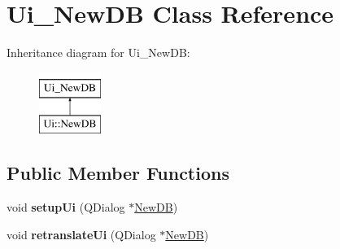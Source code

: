 \hypertarget{classUi__NewDB}{\section{Ui\-\_\-\-New\-D\-B Class Reference}
\label{classUi__NewDB}
}
Inheritance diagram for Ui\-\_\-\-New\-D\-B\-:\begin{figure}[H]
\begin{center}
\leavevmode
\includegraphics[height=2.000000cm]{classUi__NewDB}
\end{center}
\end{figure}
\subsection*{Public Member Functions}
\begin{DoxyCompactItemize}
\item 
\hypertarget{classUi__NewDB_a987269e012c9efceb2e7be46918b4823}{void {\bfseries setup\-Ui} (Q\-Dialog $\ast$\hyperlink{classNewDB}{New\-D\-B})}\label{classUi__NewDB_a987269e012c9efceb2e7be46918b4823}

\item 
\hypertarget{classUi__NewDB_a88d03cb02f4e00a0a517d33c8faf0b5c}{void {\bfseries retranslate\-Ui} (Q\-Dialog $\ast$\hyperlink{classNewDB}{New\-D\-B})}\label{classUi__NewDB_a88d03cb02f4e00a0a517d33c8faf0b5c}

\end{DoxyCompactItemize}
